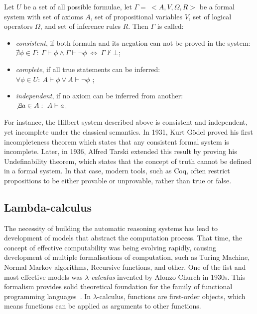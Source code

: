 \documentclass[article]{aaltoseries}
\begin{document}
Let $U$ be a set of all possible formulae, let $\Gamma = \ <A, V, \Omega, R>$ be a formal system with set of axioms $A$, set of propositional variables $V$, set of logical operators $\Omega$, and set of inference rules $R$. Then $\Gamma$ is called:
\begin{itemize}
	\itemsep0em
	\item \textit{consistent}, if both formula and its negation can not be proved in the system: \\
		$\nexists \phi \in \Gamma: \ \Gamma \vdash \phi \land \Gamma \vdash \neg \phi  \ \Leftrightarrow \ \Gamma \nvdash \bot$;
	\item \textit{complete}, if all true statements can be inferred: \\
		$\forall \phi \in U: \ A \vdash \phi \lor A \vdash \neg \phi$ ;
	\item \textit{independent}, if no axiom can be inferred from another: \\
		$\not \exists a \in A: \ A \vdash a$.
\end{itemize}

For instance, the Hilbert system described above is consistent and independent, yet incomplete under the classical semantics. In 1931, Kurt Gödel proved his first incompleteness theorem which states that any consistent formal system is incomplete. Later, in 1936, Alfred Tarski extended this result by proving his Undefinability theorem, which states that the concept of truth cannot be defined in a formal system. 
In that case, modern tools, such as Coq, often restrict propositions to be either provable or unprovable, rather than true or false.


\subsection{Lambda-calculus}
\label{sec:lambda}


The necessity of building the automatic reasoning systems has lead to development of models that abstract the computation process. That time, the concept of effective computability was being evolving rapidly, causing development of multiple formalisations of computation, such as Turing Machine, Normal Markov algorithms, Recursive functions, and other. One of the fist and most effective models was $\lambda$-\textit{calculus} invented by Alonzo Church in 1930s. This formalism provides solid theoretical foundation for the family of functional programming languages~\cite{Roj15}. In $\lambda$-calculus, functions are first-order objects, which means functions can be applied as arguments to other functions.
\end{document}
